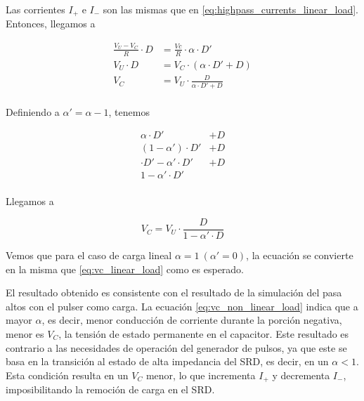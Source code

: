 Las corrientes $I_+$ e $I_-$ son las mismas que en
\ref{eq:highpass_currents_linear_load}. Entonces, llegamos a

\begin{equation}
    \label{eq:vc_non_linear_load_0}
    \begin{aligned}
        \frac{V_U-V_C}{R} \cdot D &= \frac{Vc}{R} \cdot \alpha \cdot D' \\
        V_U \cdot D &= V_C \cdot \left( \alpha \cdot D'+D \right) \\
        V_C &= V_U \cdot \frac{D}{\alpha \cdot D' + D}  \\
    \end{aligned}
\end{equation}

Definiendo a $\alpha'=\alpha-1$, tenemos

\begin{equation}
    \label{eq:vc_non_linear_load}
    \begin{aligned}
        \alpha \cdot D' &+ D \\
        (1-\alpha') \cdot D' &+ D \\
        \cdot D' - \alpha' \cdot D' &+ D \\
        1 - \alpha' \cdot D' & \\
    \end{aligned}
\end{equation}

Llegamos a

\begin{equation}
    \label{eq:vc_non_linear_load_final}
        V_C = V_U \cdot \frac{D}{1-\alpha' \cdot D}
\end{equation}

Vemos que para el caso de carga lineal $\alpha = 1 \ (\alpha'=0)$, la ecuación
se convierte en la misma que \ref{eq:vc_linear_load} como es esperado.

El resultado obtenido es consistente con el resultado de la simulación del pasa
altos con el pulser como carga. La ecuación
\ref{eq:vc_non_linear_load}  indica que a mayor $\alpha$, es decir, menor
conducción de corriente durante la porción negativa, menor es $V_C$, la tensión de
estado permanente en el capacitor. Este resultado es contrario a las necesidades
de operación del generador de pulsos, ya que este se basa en la transición al
estado de alta impedancia del SRD, es decir, en un $\alpha < 1$. Esta condición
resulta en un $V_C$ menor, lo que incrementa $I_+$ y decrementa $I_-$,
imposibilitando la remoción de carga en el SRD.

